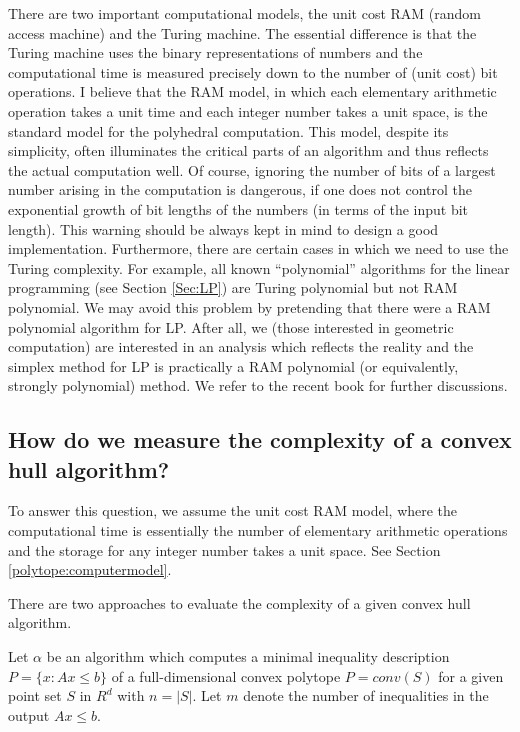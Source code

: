 \documentclass[a4paper,12pt]{article}
\begin{document}
There are two important computational models, the unit cost RAM
(random access machine)
 and the Turing machine. The essential difference is
that the Turing machine uses the binary representations
of numbers and the computational time is measured precisely
down to the number of (unit cost) bit operations.
I believe that the RAM model, in which 
each elementary arithmetic operation takes a unit time
 and each integer number takes a unit space,
is the standard model for the polyhedral computation.
This model, despite its simplicity, often illuminates
the critical parts of an algorithm and thus
reflects the actual computation well.   
Of course, ignoring the number of bits
of a largest number arising in the computation is dangerous,
if one does not control the exponential growth of bit lengths of
the numbers (in terms of the input bit length).   This warning should be
always kept in mind to design a good implementation.
Furthermore, there are certain cases in which 
we need to use the Turing complexity.
For example, all known ``polynomial'' algorithms for the linear programming
(see Section \ref{Sec:LP}) are Turing polynomial but not RAM polynomial. 
We may avoid this problem by pretending that there were a RAM polynomial
algorithm for LP.  After all, we (those interested in
geometric computation) are interested in an analysis
which reflects the reality and the simplex method for LP is
practically a RAM polynomial (or equivalently, strongly polynomial)
method. 
We refer to the recent book \cite{y-fpaa-00} for further discussions.

\subsection{How do we measure the complexity of 
 a convex hull algorithm?} \label{polytope:rconvcomplexity}

To answer this question, we assume the unit cost RAM model, where
the computational time is essentially
the number of elementary arithmetic operations and the storage for 
any integer number takes a unit space. See Section \ref{polytope:computermodel}.

There are two approaches to evaluate
the complexity of a given convex hull algorithm.

Let $\alpha$ be an algorithm which computes a minimal 
inequality description $P=\{x : A x \le b \}$
of a full-dimensional convex polytope $P=conv(S)$ 
for a given point set $S$ in $R^d$
with $n=|S|$.  Let $m$ denote the number of inequalities in
the output $A x \le b$.  
\end{document}
